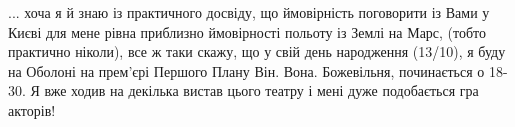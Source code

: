 ... хоча я й знаю із практичного досвіду, що ймовірність поговорити із Вами у
Києві для мене рівна приблизно ймовірності польоту із Землі на Марс, (тобто
практично ніколи), все ж таки скажу, що у свій день народження (13/10), я буду
на Оболоні на прем'єрі Першого Плану Він. Вона. Божевільня, починається о
18-30. Я вже ходив на декілька вистав цього театру і мені дуже подобається гра
акторів!
